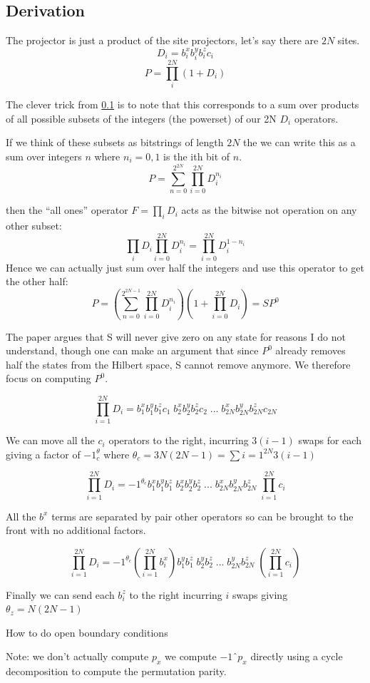 \subsection{Derivation}
The projector is just a product of the site projectors, let's say there are \(2N\) sites.
\[D_i = b^x_i b^y_i b^z_i c_i \]
\[P = \prod_i^{2N} (1 + D_i)\]

The clever trick from \ref{} is to note that this corresponds to a sum over products of all possible subsets of the integers (the powerset) of our 2N \(D_i\) operators. 

If we think of these subsets as bitstrings of length \(2N\) the we can write this as a sum over integers \(n\) where \(n_i = 0,1\) is the ith bit of \(n\).
\[P = \sum_{n = 0}^{2^{2N}} \prod_{i=0}^{2N} D_i^{n_i}\]

then the ``all ones'' operator \(F = \prod_i D_i\) acts as the bitwise not operation on any other subset:
\[ \prod_i D_i \prod_{i=0}^{2N} D_i^{n_i} = \prod_{i=0}^{2N} D_i^{1 - n_i}\]
Hence we can actually just sum over half the integers and use this operator to get the other half:
\[P = \left(\sum_{n = 0}^{2^{2N - 1}} \prod_{i=0}^{2N} D_i^{n_i} \right) (1 + \prod_{i=0}^{2N} D_i) = S P^0\]

The paper argues that S will never give zero on any state for reasons I do not understand, though one can make an argument that since \(P^0\) already removes half the states from the Hilbert space, S cannot remove anymore.  We therefore focus on computing \(P^0\).

\[\prod_{i=1}^{2N} D_i = b^x_1 b^y_1 b^z_1 c_1\; b^x_2 b^y_2 b^z_2 c_2\; ... \;b^x_{2N} b^y_{2N} b^z_{2N} c_{2N}\]

We can move all the \(c_i\) operators to the right, incurring \(3(i-1)\) swaps for each giving a factor of \(-1 ^ \theta_c\) where \( \theta_c = {3N(2N-1)} = \sum{i = 1}^{2N} 3(i-1)\)

\[\prod_{i=1}^{2N} D_i = -1^{\theta_c}b^x_1 b^y_1 b^z_1\; b^x_2 b^y_2 b^z_2\; ... \;b^x_{2N} b^y_{2N} b^z_{2N}\;\prod_{i=1}^{2N}c_i\]

All the \(b^x\) terms are separated by pair other operators so can be brought to the front with no additional factors.

\[\prod_{i=1}^{2N} D_i = -1^{\theta_c}\left(\prod_{i=1}^{2N}b^x_i\right) b^y_1 b^z_1\; b^y_2 b^z_2\; ... \; b^y_{2N} b^z_{2N}\;\left(\prod_{i=1}^{2N}c_i\right)\]

Finally we can send each \(b^z_i\) to the right incurring \(i\) swaps giving \(\theta_z = N(2N - 1)\) 

How to do open boundary conditions

Note: we don't actually compute \(p_x\) we compute \(-1ˆp_x\) directly using a cycle decomposition to compute the permutation parity.


    
    
    